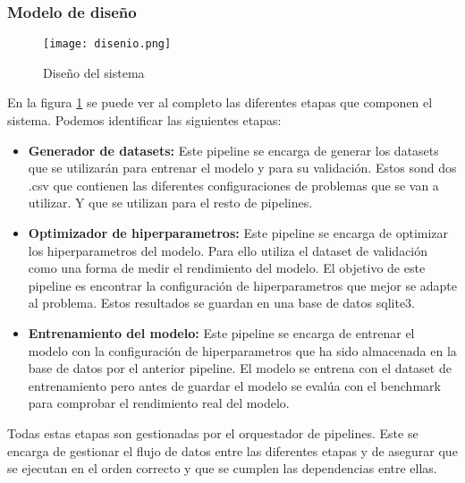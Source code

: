\subsubsection{Modelo de diseño}
\begin{figure}[ht]
    \centering
    \texttt{[image: disenio.png]}
    \caption{Diseño del sistema}
    \label{fig:desing}
\end{figure}

En la figura \ref{fig:desing} se puede ver al completo las diferentes etapas que componen
el sistema. Podemos identificar las siguientes etapas:
\begin{itemize}
    \item \textbf{Generador de datasets: } Este pipeline se encarga de generar los datasets
    que se utilizarán para entrenar el modelo y para su validación. Estos sond dos .csv que
    contienen las diferentes configuraciones de problemas que se van a utilizar. Y que se
    utilizan para el resto de pipelines.
    \item \textbf{Optimizador de hiperparametros: } Este pipeline se encarga de optimizar
    los hiperparametros del modelo. Para ello utiliza el dataset de validación como una
    forma de medir el rendimiento del modelo. El objetivo de este pipeline es encontrar
    la configuración de hiperparametros que mejor se adapte al problema. Estos resultados
    se guardan en una base de datos sqlite3.
    \item \textbf{Entrenamiento del modelo: } Este pipeline se encarga de entrenar el modelo
    con la configuración de hiperparametros que ha sido almacenada en la base de datos por el
    anterior pipeline. El modelo se entrena con el dataset de entrenamiento pero antes de
    guardar el modelo se evalúa con el benchmark para comprobar el rendimiento real del modelo.
\end{itemize} 

Todas estas etapas son gestionadas por el orquestador de pipelines. Este se encarga de
gestionar el flujo de datos entre las diferentes etapas y de asegurar que se ejecutan en
el orden correcto y que se cumplen las dependencias entre ellas.